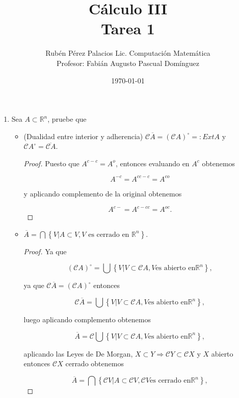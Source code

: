\documentclass[letterpaper]{article}
\title{Cálculo III \\ Tarea 1}
\author{Rubén Pérez Palacios Lic. Computación Matemática\\Profesor: Fabián Augusto Pascual Domínguez}
\date{\today}
\theoremstyle{definition}
\theoremstyle{lemathm}
\theoremstyle{lemathm}
\theoremstyle{lemathm}
\theoremstyle{lemademthm}
\newcommand{\pars}[1]{\left( #1 \right) }
\newcommand{\set}[1]{\left \{ #1 \right\} }
\newcommand{\RR}{\mathbb{R}}
\newcommand{\1}{\mathbbm{1}}
\newcommand{\then}{\Rightarrow}
\begin{document}
	\maketitle

	\begin{enumerate}
		
		\item Sea $A\subset\RR^n$, pruebe que
		
		\begin{itemize}
			\item (Dualidad entre interior y adherencia) $\mathcal{C}\overline{A} = \pars{\mathcal{C}A}^{\circ} =: Ext A$ y $\mathcal{C}A^{\circ} = \overline{\mathcal{C}A}$.
			
			\begin{proof}

				Puesto que $A^{c-c} = A^{o}$, entonces evaluando en $A^{c}$ obtenemos
				
				\[A^{-c} = A^{cc-c} = A^{co}\]
				
				y aplicando complemento de la original obtenemos
				
				\[A^{c-} = A^{c-cc} = A^{oc}.\]

			\end{proof}
			

			\item $\overline{A} = \bigcap\set{V|A\subset V, V \text{ es cerrado en } \RR^n}$.
			
			\begin{proof}
				
				Ya que
	
				\[\pars{\mathcal{C}A}^{\circ} = \bigcup\set{V | V \subset \mathcal{C}A, V \text{es abierto en} \RR^n},\]
	
				ya que $\mathcal{C}\overline{A} = \pars{\mathcal{C}A}^{\circ}$ entonces
	
				\[\mathcal{C}\overline{A} = \bigcup\set{V | V \subset \mathcal{C}A, V \text{es abierto en} \RR^n},\]
	
				luego aplicando complemento obtenemos
	
				\[\overline{A} = \mathcal{C}\bigcup\set{V | V \subset \mathcal{C}A, V \text{es abierto en} \RR^n},\]
				
				aplicando las Leyes de De Morgan, $X\subset Y \then \mathcal{C}Y\subset \mathcal{C}X$ y $X$ abierto entonces $\mathcal{C}X$ cerrado obtenemos
	
				\[\overline{A} = \bigcap\set{\mathcal{C}V | A \subset \mathcal{C}V, \mathcal{C}V \text{es cerrado en} \RR^n},\]
				

\end{proof}
\end{itemize}
\end{enumerate}
\end{document}
